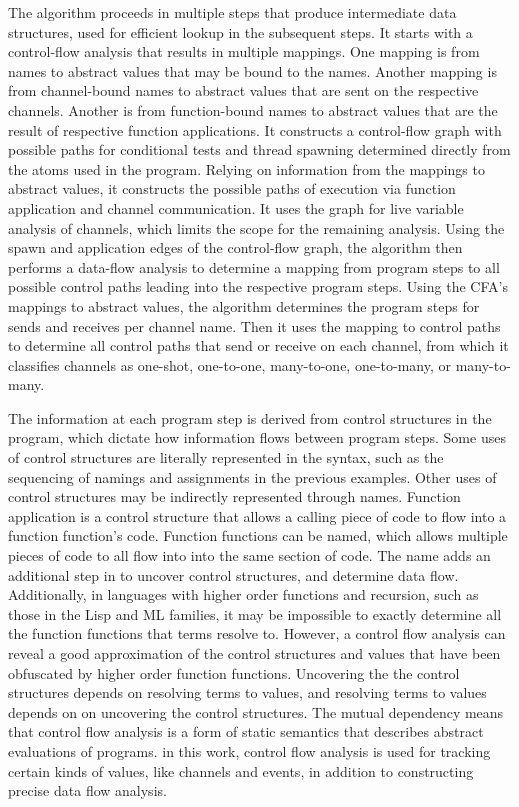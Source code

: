 \documentclass[10pt]{article}
\begin{document}
The algorithm proceeds in multiple steps that produce intermediate data structures, used for
efficient lookup in the subsequent steps.  It starts with a control-flow analysis \cite{} that
results in multiple mappings. One mapping is from names to abstract values that may be bound to
the names. Another mapping is from channel-bound names to abstract values that are
sent on the respective channels. Another is from function-bound names to abstract values
that are the result of respective function applications.  It constructs a control-flow graph 
with possible paths for conditional tests and thread spawning determined directly from the
atoms used in the program.  Relying on information from the mappings to abstract values,
it constructs the possible paths of execution via function application and channel
communication.  It uses the graph for live variable analysis of channels, which limits the
scope for the remaining analysis.  Using the spawn and application edges of the control-flow
graph, the algorithm then performs a data-flow analysis to determine a mapping from program
steps to all possible control paths leading into the respective program steps.  Using the
CFA's mappings to abstract values, the algorithm determines the program steps for sends and
receives per channel name.  Then it uses the mapping to control paths to determine all
control paths that send or receive on each channel, from which it classifies channels as
one-shot, one-to-one, many-to-one, one-to-many, or many-to-many.




The information at each program step is derived from control structures in the program, which
dictate how information flows between program steps. Some uses of control structures are
literally represented in the syntax, such as the sequencing of namings and assignments in the
previous examples. Other uses of control structures may be indirectly represented through
names. Function application is a control structure that allows a calling piece of code to
flow into a function function's code.  Function functions can be named, which allows
multiple pieces of code to all flow into into the same section of code. The name adds an
additional step in to uncover control structures, and determine data flow.
Additionally, in languages with higher order functions and recursion, such as those in the Lisp
and ML families, it may be impossible to exactly determine all the function functions that
terms resolve to. However, a control flow analysis can reveal a good
approximation of the control structures and values that have been obfuscated by higher order
function functions.  Uncovering the the control structures depends on resolving terms
to values, and resolving terms to values depends on on uncovering the control
structures. The mutual dependency means that control flow analysis is a form of
static semantics that describes abstract evaluations of programs. in this work, control flow
analysis is used for tracking certain kinds of values, like channels and events, in addition to
constructing precise data flow analysis. 
\end{document}
